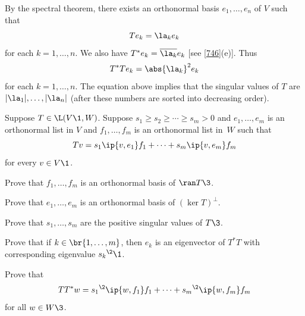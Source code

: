 \begin{Solution}
By the spectral theorem, there exists an orthonormal basis $e_1, \dots, e_n$ of $V$ such that
\[
Te_k = \la_k e_k
\]
for each $k = 1, \ldots, n$. We also have $T^* e_k = \overline{\la_k} e_k$ [see \ref{746}(e)].
Thus
\[
T^*Te_k = \abs{\la_k}^2 e_k
\]
for each $k = 1, \ldots, n$.  The equation above implies that the singular values of $T$ are $|\la_1|, \dots, |\la_n|$ (after these numbers are sorted into decreasing order).
\end{Solution}

\exercise
Suppose $T \in \L(V\1, W)$. Suppose $s_1 \ge  s_2 \ge \cdots \ge s_m >0$ and
$e_1, \dots, e_m$ is an orthonormal list in $V$ and $f_1, \dots, f_m$ is an orthonormal list in~$W$ such that \label{4SVD}
\[
Tv = s_1 \ip{v, e_1} f_1 + \dots + s_m \ip{v, e_m} f_m
\]
for every $v \in V\1$.
\begin{subtheorem}
\item
Prove that $f_1, \dots, f_m$ is an orthonormal basis of $\ran T\3$.
\item
Prove that $e_1, \dots, e_m$  is an orthonormal basis of $(\ker T)^\perp$.
\item
Prove that $s_1, \ldots, s_m$ are the positive singular values of $T\3$.
\item
Prove that if $k \in \br{1, \ldots, m}$, then $e_k$ is an eigenvector of $T^*T$ with corresponding eigenvalue ${s_k}^{\2}\1$.
\item
Prove that
\[
TT^*w = {s_1}^{\2} \ip{w, f_1} f_1 + \cdots + {s_m}^{\2} \ip{w, f_m} f_m
\]
for all $w \in W\3$.
\end{subtheorem}
\exercisesubtheoremend

